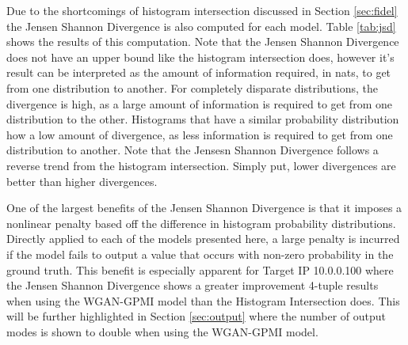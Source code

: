 Due to the shortcomings of histogram intersection discussed in Section \ref{sec:fidel} the Jensen Shannon Divergence is also computed for each model. Table \ref{tab:jsd} shows the results of this computation. Note that the Jensen Shannon Divergence does not have an upper bound like the histogram intersection does, however it's result can be interpreted as the amount of information required, in nats, to get from one distribution to another. For completely disparate distributions, the divergence is high, as a large amount of information is required to get from one distribution to the other. Histograms that have a similar probability distribution how a low amount of divergence, as less information is required to get from one distribution to another. Note that the Jensesn Shannon Divergence follows a reverse trend from the histogram intersection. Simply put, lower divergences are better than higher divergences. 

One of the largest benefits of the Jensen Shannon Divergence is that it imposes a nonlinear penalty based off the difference in histogram probability distributions. Directly applied to each of the models presented here, a large penalty is incurred if the model fails to output a value that occurs with non-zero probability in the ground truth. This benefit is especially apparent for Target IP 10.0.0.100 where the Jensen Shannon Divergence shows a greater improvement 4-tuple results when using the WGAN-GPMI model than the Histogram Intersection does. This will be further highlighted in Section \ref{sec:output} where the number of output modes is shown to double when using the WGAN-GPMI model. 

